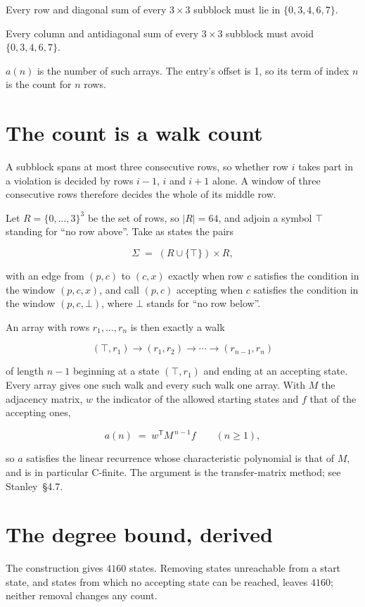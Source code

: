 \documentclass[11pt]{article}
\theoremstyle{definition}
\begin{document}
Every row and diagonal sum of every $3\times3$ subblock must lie in $\{0, 3, 4, 6, 7\}$.

Every column and antidiagonal sum of every $3\times3$ subblock must avoid $\{0, 3, 4, 6, 7\}$.

$a(n)$ is the number of such arrays. The entry's offset is 1, so its term of index $n$ is the count for $n$ rows.

\section{The count is a walk count}

A subblock spans at most three consecutive rows, so whether row $i$ takes part in a violation is decided by rows $i-1$, $i$ and $i+1$ alone. A window of three consecutive rows therefore decides the whole of its middle row.

Let $R = \{0,\dots,3\}^{3}$ be the set of rows, so $|R| = 64$, and adjoin a symbol $\top$ standing for ``no row above''. Take as states the pairs

\[\Sigma \;=\; (R \cup \{\top\}) \times R,\]

with an edge from $(p,c)$ to $(c,x)$ exactly when row $c$ satisfies the condition in the window $(p,c,x)$, and call $(p,c)$ accepting when $c$ satisfies the condition in the window $(p,c,\bot)$, where $\bot$ stands for ``no row below''.

An array with rows $r_1,\dots,r_n$ is then exactly a walk

\[(\top,r_1) \to (r_1,r_2) \to \cdots \to (r_{n-1},r_n)\]

of length $n-1$ beginning at a state $(\top,r_1)$ and ending at an accepting state. Every array gives one such walk and every such walk one array. With $M$ the adjacency matrix, $w$ the indicator of the allowed starting states and $f$ that of the accepting ones,

\[a(n) \;=\; w^{\mathsf T} M^{\,n-1} f \qquad (n \ge 1),\]

so $a$ satisfies the linear recurrence whose characteristic polynomial is that of $M$, and is in particular C-finite. The argument is the transfer-matrix method; see Stanley~\S4.7.

\section{The degree bound, derived}

The construction gives $4160$ states. Removing states unreachable from a start state, and states from which no accepting state can be reached, leaves $4160$; neither removal changes any count.
\end{document}

